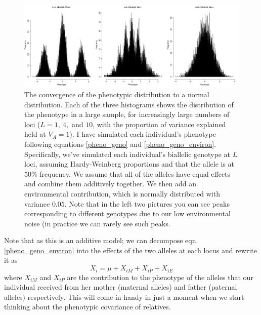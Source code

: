 \begin{figure}
\begin{center}
\includegraphics[width=\textwidth]{figures/QT1.png}
\end{center}
\caption{The convergence of the phenotypic distribution to a normal
  distribution. Each of the three histograms shows the distribution of
the phenotype in a large sample, for increasingly large numbers of loci ($L=1,~4,$ and $10$, with the proportion of variance explained held at $V_A=1$). I have simulated each individual's
phenotype following equations \ref{pheno_geno} and \ref{pheno_geno_environ}. Specifically, we've simulated each
individual's biallelic genotype at $L$ loci, assuming Hardy-Weinberg proportions
and that the allele is at 50\% frequency. We assume that all of the
alleles have equal effects and combine them additively together. We then add an environmental contribution, which is normally distributed with variance $0.05$. Note that in the left two pictures you can see peaks
corresponding to different genotypes due to our low  environmental
noise (in practice we can rarely see such peaks. } \label{fig:QT1}
\end{figure}
Note that as this is an additive model; we can decompose eqn. \ref{pheno_geno_environ} into the
effects of the two alleles at each locus and rewrite
it as
\begin{equation}
X_i = \mu + X_{iM}+X_{iP} +X_{iE}
\end{equation}
where $X_{iM}$ and $X_{iP}$ are the contribution to the phenotype of
the alleles that our individual received from her mother (maternal
alleles) and father (paternal alleles) respectively. This will come in
handy in just a moment when we start thinking about the phenotypic covariance of relatives.\\

